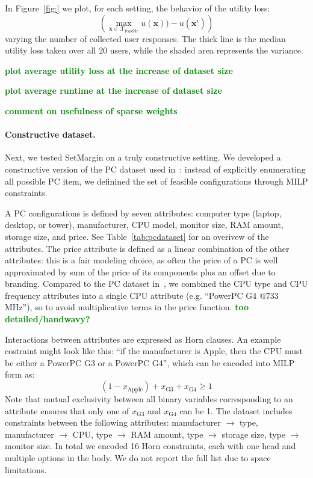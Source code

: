 \documentclass{article}
\renewcommand\[{\begin{equation}}
\renewcommand\]{\end{equation}}
\newcommand{\calvar}[1]{\ensuremath{\mathcal{#1}}}
\newcommand{\calX}{\calvar{X}}
\newcommand{\vecvar}[1]{\ensuremath{\boldsymbol{#1}}}
\newcommand{\vx}{\vecvar{x}}
\newcommand{\stefano}[1]{{\bf \textcolor{green}{{\fbox{Stefano:} #1}}}}
\begin{document}
In Figure~\ref{fig:} we plot, for each setting, the behavior of the utility
loss:
%
$$ \left(\max_{\vx\in\calX_\text{feasible}} u(\vx)) - u(\vx^{i}) \right) $$
%
varying the number of collected user responses. The thick line is the median
utility loss taken over all 20 users, while the shaded area represents the
variance. 

\stefano{plot average utility loss at the increase of dataset size}

\stefano{plot average runtime at the increase of dataset size}

\stefano{comment on usefulness of sparse weights}

\paragraph{Constructive dataset.} Next, we tested {\sc SetMargin} on a truly
constructive setting. We developed a constructive version of the PC dataset
used in~\cite{guo2010real}: instead of explicitly enumerating all possible PC
item, we definined the set of feasible configurations through MILP constraints.

A PC configurations is defined by seven attributes: computer type (laptop,
desktop, or tower), manufacturer, CPU model, monitor size, RAM amount, storage
size, and price. See Table~\ref{tab:pcdataset} for an overivew of the
attributes. The price attribute is defined as a linear combination of the other
attributes: this is a fair modeling choice, as often the price of a PC is
well approximated by sum of the price of its components plus an offset due to
branding. Compared to the PC dataset in~\cite{guo2010real}, we combined the CPU
type and CPU frequency attributes into a single CPU attribute (e.g. ``PowerPC
G4 @733 MHz''), so to avoid multiplicative terms in the price function.
\stefano{too detailed/handwavy?}

Interactions between attributes are expressed as Horn clauses. An example
costraint might look like this: ``if the manufacturer is Apple, then the
CPU must be either a PowerPC G3 or a PowerPC G4'', which can be encoded
into MILP form as:
%
$$ (1 - x_\text{Apple}) + x_\text{G3} + x_\text{G4} \ge 1 $$
%
Note that mutual exclusivity between all binary variables corresponding to an
attribute ensures that only one of $x_\text{G3}$ and $x_\text{G4}$ can be 1.
The dataset includes constraints between the following attributes: manufacturer
$\to$ type, manufacturer $\to$ CPU, type $\to$ RAM amount, type $\to$ storage
size, type $\to$ monitor size. In total we encoded 16 Horn constraints, each
with one head and multiple options in the body. We do not report the full
list due to space limitations.
\end{document}
